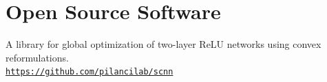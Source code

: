 \documentclass[11pt, a4paper]{article}
\begin{document}
\section{Open Source Software}
\begin{description}[leftmargin=6.5em,style=nextline,font=\normalfont\space]
    \item[SCNN]
          A library for global optimization of two-layer ReLU networks using
          convex reformulations.
          \\
          \texttt{\url{https://github.com/pilancilab/scnn}}
\end{description}
\end{document}
